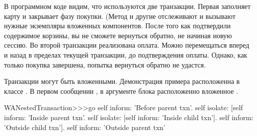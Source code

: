 \documentclass[a4paper,10pt,twoside]{book}
\begin{document}

В программном коде видим, что используются две транзакции.
Первая заполняет карту и закрывает фазу покупки.
(Метод  и другие отслеживают и вызывают нужные
экземпляры вложенных компонентов.
После того как подтвердили содержимое корзины,
вы не сможете вернуться обратно, не начиная новую сессию.
Во второй транзакции реализована оплата.
Можно перемещаться вперед и назад в пределах текущей транзакции,
до подтверждения оплаты.
Однако, как только покупка завершена, попытка вернуться обратно не удастся.


Транзакции могут быть вложенными.
Демонстрация примера расположенна в классе .
В первом сообщении ,
в аргументе блока расположенно вложенное .

\begin{code}{}
WANestedTransaction>>>go
	self inform: 'Before parent txn'.
	self isolate:
			[self inform: 'Inside parent txn'.
			self isolate: [self inform: 'Inside child txn'].
			self inform: 'Outside child txn'].
	self inform: 'Outside parent txn'
\end{code}


\end{document}
